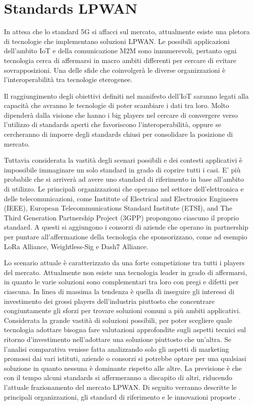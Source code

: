 \documentclass[12pt,a4paper,openright,twoside]{report}
\begin{document}
\chapter{Standards LPWAN}
In attesa che lo standard 5G si affacci sul mercato, attualmente esiste una pletora di tecnologie che implementano soluzioni LPWAN. 
Le possibili applicazioni dell'ambito IoT e della comunicazione M2M sono innumerevoli, pertanto ogni tecnologia cerca di affermarsi in macro ambiti differenti per cercare di evitare sovrapposizioni. 
Una delle sfide che coinvolger\`a le diverse organizzazioni \`e l'interoperabilit\`a tra tecnologie eterogenee. 

Il raggiungimento degli obiettivi definiti nel manifesto dell'IoT saranno legati alla capacit\`a che avranno le tecnologie di poter scambiare i dati tra loro. 
Molto dipender\`a dalla visione che hanno i big players nel cercare di convergere verso l'utilizzo di standards aperti che favoriscono l'interoperabilit\`a, oppure se cercheranno di imporre degli standards chiusi per consolidare la posizione di mercato.

Tuttavia considerata la vastit\`a degli scenari possibili e dei contesti applicativi \`e impossibile immaginare un solo standard in grado di coprire tutti i casi. 
E' pi\`u probabile che si arriver\`a ad avere uno standard di riferimento in base all'ambito di utilizzo.
Le principali organizzazioni che operano nel settore dell'elettronica e delle telecomunicazioni, come  Institute of Electrical and Electronics Engineers (IEEE), European Telecommunications Standard Institute (ETSI), and The Third Generation Partnership Project (3GPP) propongono ciascuno il proprio standard. 
A questi si aggiungono i consorzi di aziende che operano in partnership per puntare all'affermazione della tecnologia che sponsorizzano, come ad esempio LoRa Alliance, Weightless-Sig e Dash7 Alliance.

Lo scenario attuale \`e caratterizzato da una forte competizione tra tutti i players del mercato. Attualmente non esiste una tecnologia leader in grado di affermarsi, in quanto le varie soluzioni sono complementari tra loro con pregi e difetti per ciascuna. 
In linea di massima la tendenza \`e quella di inseguire gli interessi di investimento dei grossi players dell'industria piuttosto che concentrare congiuntamente gli sforzi per trovare soluzioni comuni a pi\`u ambiti applicativi. 
Considerata la grande vastit\`a di soluzioni possibili, per poter scegliere quale tecnologia adottare bisogna fare valutazioni approfondite sugli aspetti tecnici sul ritorno d'investimento nell'adottare una soluzione piuttosto che un'altra. 
Se l'analisi comparativa venisse fatta analizzando solo gli aspetti di marketing promossi dai vari istituti, aziende o consorzi si potrebbe optare per una qualsiasi soluzione in quanto nessuna \`e dominante rispetto alle altre.
La previsione \`e che con il tempo alcuni standards si affermeranno a discapito di altri, riducendo l'attuale frazionamento del mercato LPWAN. 
Di seguito verranno descritte le principali organizzazioni, gli standard di riferimento e le innovazioni proposte \cite{K2}.
\end{document}
